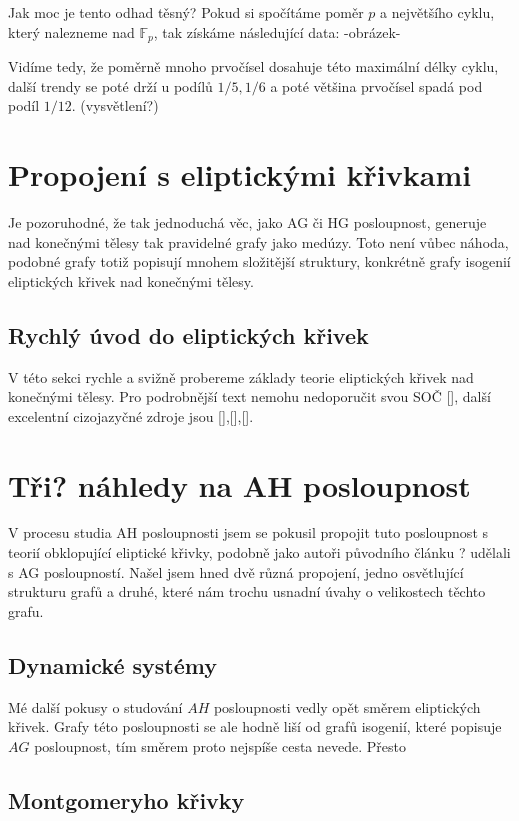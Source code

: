 \documentclass[12pt]{report}
\begin{document}
Jak moc je tento odhad těsný? Pokud si spočítáme poměr $p$ a největšího cyklu, který nalezneme nad $\mathbb{F}_p$, tak získáme následující data:
-obrázek-

Vidíme tedy, že poměrně mnoho prvočísel dosahuje této maximální délky cyklu, další trendy se poté drží u podílů $1/5, 1/6$ a poté většina prvočísel spadá pod podíl $1/12$. (vysvětlení?)


\chapter{Propojení s eliptickými křivkami}

Je pozoruhodné, že tak jednoduchá věc, jako AG či HG posloupnost, generuje nad konečnými tělesy tak pravidelné grafy jako medúzy. Toto není vůbec náhoda, podobné grafy totiž popisují mnohem složitější struktury, konkrétně grafy isogenií eliptických křivek nad konečnými tělesy.

\section{Rychlý úvod do eliptických křivek}
V této sekci rychle a svižně probereme základy teorie eliptických křivek nad konečnými tělesy. Pro podrobnější text nemohu nedoporučit svou SOČ [], další excelentní cizojazyčné zdroje jsou [],[],[].

 


\chapter{Tři? náhledy na AH posloupnost}

V procesu studia AH posloupnosti jsem se pokusil propojit tuto posloupnost s teorií obklopující eliptické křivky, podobně jako autoři původního článku ? udělali s AG posloupností. Našel jsem hned dvě různá propojení, jedno osvětlující strukturu grafů a druhé, které nám trochu usnadní úvahy o velikostech těchto grafu.

\section{Dynamické systémy}


Mé další pokusy o studování $AH$ posloupnosti vedly opět směrem eliptických křivek. Grafy této posloupnosti se ale hodně liší od grafů isogenií, které popisuje $AG$ posloupnost, tím směrem proto nejspíše cesta nevede. Přesto 

\section{Montgomeryho křivky}
\end{document}
